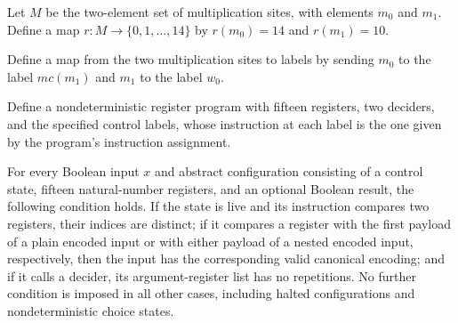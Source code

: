 \begin{definition}
\label{Complexity.LogProg.mulR}
\leanok
{}
Let $M$ be the two-element set of multiplication sites, with elements $m_0$ and $m_1$.
Define a map $r:M\to\{0,1,\ldots,14\}$ by $r(m_0)=14$ and $r(m_1)=10$.
\end{definition}

\begin{definition}
\label{Complexity.LogProg.mulEx}
\leanok
{}
Define a map from the two multiplication sites to labels by sending $m_0$ to the label
$mc(m_1)$ and $m_1$ to the label $w_0$.
\end{definition}

\begin{definition}
\label{Complexity.LogProg.upA}
\leanok
{}
Define a nondeterministic register program with fifteen registers, two deciders, and the
specified control labels, whose instruction at each label is the one given by the
program's instruction assignment.
\end{definition}

\begin{lemma}
\label{Complexity.LogProg.upA_npreS}
\leanok
{}
For every Boolean input $x$ and abstract configuration consisting of a control state,
fifteen natural-number registers, and an optional Boolean result, the following
condition holds. If the state is live and its instruction compares two registers, their
indices are distinct; if it compares a register with the first payload of a plain
encoded input or with either payload of a nested encoded input, respectively, then the
input has the corresponding valid canonical encoding; and if it calls a decider, its
argument-register list has no repetitions. No further condition is imposed in all other
cases, including halted configurations and nondeterministic choice states.
\end{lemma}

